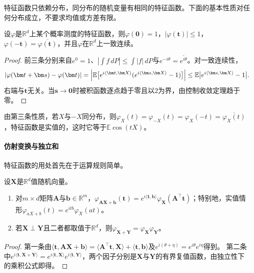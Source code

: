 特征函数只依赖分布，同分布的随机变量有相同的特征函数。下面的基本性质对任何分布成立，不要求均值或方差有限。

\begin{theorem}[特征函数的基本性质]
\label{thm:wlim-chf-basic}
设$\varphi$是$\mathbb R^d$上某个概率测度的特征函数，则$\varphi(\bm 0)=1$，$|\varphi(\bm t)|\leq1$，$\varphi(-\bm t)=\overline{\varphi(\bm t)}$，并且$\varphi$在$\mathbb R^d$上一致连续。
\end{theorem}

\begin{proof}
前三条分别来自$e^{0}=1$、$|\int f\,dP|\leq\int|f|\,dP$与$e^{-i\theta}=\overline{e^{i\theta}}$。对一致连续性，
\[
  |\varphi(\bm t+\bm s)-\varphi(\bm t)|=\Bigl|\mathbb E\bigl[e^{i\langle\bm t,\bm X\rangle}(e^{i\langle\bm s,\bm X\rangle}-1)\bigr]\Bigr|\leq\mathbb E\bigl|e^{i\langle\bm s,\bm X\rangle}-1\bigr|.
\]
右端与$\bm t$无关。当$\bm s\to\bm 0$时被积函数逐点趋于零且以$2$为界，由控制收敛定理趋于零。
\end{proof}

由第三条性质，若$X$与$-X$同分布，则$\varphi_X(t)=\varphi_{-X}(t)=\varphi_X(-t)=\overline{\varphi_X(t)}$，特征函数是实值的，这时它等于$\mathbb E\cos(tX)$。

\paragraph{仿射变换与独立和}
特征函数的用处首先在于运算规则简单。

\begin{theorem}[仿射变换与独立和]
\label{thm:wlim-chf-operations}
设$\bm X$是$\mathbb R^d$值随机向量。
\begin{enumerate}
  \item 对$m\times d$矩阵$\bm A$与$\bm b\in\mathbb R^m$，$\varphi_{\bm A\bm X+\bm b}(\bm t)=e^{i\langle\bm t,\bm b\rangle}\varphi_{\bm X}(\bm A^\top\bm t)$；特别地，实值情形$\varphi_{aX+b}(t)=e^{itb}\varphi_X(at)$。
  \item 若$\bm X\perp\bm Y$且二者都取值于$\mathbb R^d$，则$\varphi_{\bm X+\bm Y}=\varphi_{\bm X}\varphi_{\bm Y}$。
\end{enumerate}
\end{theorem}

\begin{proof}
第一条由$\langle\bm t,\bm A\bm X+\bm b\rangle=\langle\bm A^\top\bm t,\bm X\rangle+\langle\bm t,\bm b\rangle$及$e^{i(\theta+\eta)}=e^{i\theta}e^{i\eta}$得到。
第二条中$e^{i\langle\bm t,\bm X+\bm Y\rangle}=e^{i\langle\bm t,\bm X\rangle}e^{i\langle\bm t,\bm Y\rangle}$，两个因子分别是$\bm X$与$\bm Y$的有界复值函数，由独立性下的乘积公式即得。
\end{proof}

